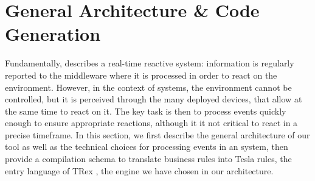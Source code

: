 \section{General Architecture \& Code Generation}
\label{sec:CG}

Fundamentally, \IOTDSL describes a real-time reactive system: information is regularly reported to the middleware where it is processed in order to react on the environment. However, in the context of \IOT systems, the environment cannot be controlled, but it is perceived through the many deployed devices, that allow at the same time to react on it. The key task is then to process events quickly enough to ensure appropriate reactions, although it it not critical to react in a precise timeframe. In this section, we first describe the general architecture of our tool as well as the technical choices for processing events in an \IOT system, then provide a compilation schema to translate \IOTDSL business rules into Tesla rules, the entry language of TRex \cite{cugola-12}, the \CEP engine we have chosen in our architecture.



